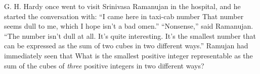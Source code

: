 G. H. Hardy once went to visit Srinivasa Ramanujan in the hospital, and he started the conversation with: “I came here in taxi-cab number  That number seems dull to me, which I hope isn’t a bad omen.” “Nonsense,” said Ramanujan. “The number isn’t dull at all. It’s quite interesting. It’s the smallest number that can be expressed as the sum of two cubes in two different ways.” Ramujan had immediately seen that  What is the smallest positive integer representable as the sum of the cubes of \textit{three} positive integers in two different ways?